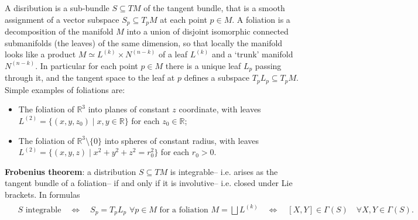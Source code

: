 \documentclass[../geometry_main.tex]{subfiles}
\begin{document}
\begin{mytheorem}
%
A disribution is a sub-bundle $S \subseteq TM$ of the tangent bundle, that is a smooth assignment of a vector subspace $S_p \subseteq T_p M$ at each point $p\in M$.
A foliation is a decomposition of the manifold $M$ into a union of disjoint isomorphic connected submanifolds (the leaves) of the same dimension, so that locally the manifold looks like a product $M \simeq L^{(k)} \times N^{(n-k)}$ of a leaf $L^{(k)}$ and a `trunk' manifold $N^{(n-k)}$.
In particular for each point $p\in M$ there is a unique leaf $L_p$ passing through it, and the tangent space to the leaf at $p$ defines a subspace $T_p L_p \subseteq T_p M$.
Simple examples of foliations are:
\begin{itemize}
    \item The foliation of $\mathbb{R}^3$ into planes of constant $z$ coordinate, with leaves $L^{(2)} = \{(x,y,z_0) \mid x,y\in \mathbb{R}\}$ for each $z_0\in \mathbb{R}$;
    \item The foliation of $\mathbb{R}^3\setminus \{0\}$ into spheres of constant radius, with leaves $L^{(2)} = \{(x,y,z) \mid x^2+y^2+z^2 = r_0^2\}$ for each $r_0>0$.
\end{itemize}

\textbf{Frobenius theorem}: a distribution $S \subseteq TM$ is integrable-- i.e. arises as the tangent bundle of a foliation-- if and only if it is involutive-- i.e. closed under Lie brackets.
In formulas
\begin{align}
\begin{aligned}
    &S \text{ integrable} \quad \Leftrightarrow \quad S_p = T_pL_p \,\, \forall p\in M\text{ for a foliation } M = \bigsqcup L^{(k)} 
    \quad \Leftrightarrow \quad [X,Y] \in \Gamma(S) \quad \forall X,Y \in \Gamma(S).  
\end{aligned}
\end{align}
%
\end{mytheorem}
\end{document}

